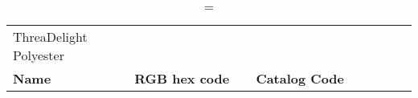 
\begin{longtable}{p{0.3\linewidth} p{0.3\linewidth} p{0.4\linewidth}}
\caption = {ThreaDelight Polyester}
\label{tblr:threadelight}\\
\textbf{Name} & \textbf{RGB hex code} & \textbf{Catalog Code} \\

\end{longtable}

